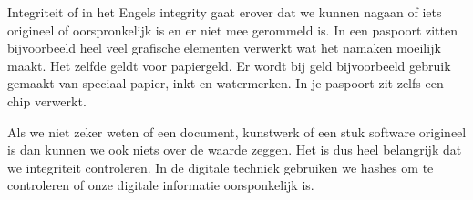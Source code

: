 Integriteit of in het Engels integrity gaat erover dat we kunnen nagaan of iets origineel of oorspronkelijk is en er niet mee gerommeld is. In een paspoort zitten bijvoorbeeld heel veel grafische elementen verwerkt wat het namaken moeilijk maakt. Het zelfde geldt voor papiergeld. Er wordt bij geld bijvoorbeeld gebruik gemaakt van speciaal papier, inkt en watermerken. In je paspoort zit zelfs een chip verwerkt.

Als we niet zeker weten of een document, kunstwerk of een stuk software origineel is dan kunnen we ook niets over de waarde zeggen. Het is dus heel belangrijk dat we integriteit controleren. In de digitale techniek gebruiken we hashes om te controleren of onze digitale informatie oorsponkelijk is.
